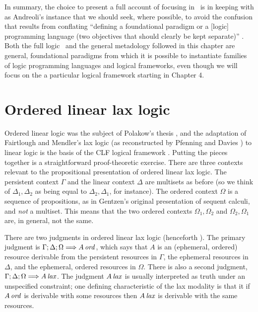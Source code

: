 In summary, the choice to present a full account of focusing in
\ollll~is in keeping with as Andreoli's instance that we should seek,
where possible, to avoid the confusion that results from conflating
``defining a foundational paradigm or a [logic] programming language
(two objectives that should clearly be kept separate)''
\cite{andreoli01focussing}. Both the full logic \ollll~and the general
metadology followed in this chapter are general, foundational
paradigms from which it is possible to instantiate families of logic
programming languages and logical frameworks, even though we will
focus on the a particular logical framework starting in Chapter 4.

\section{Ordered linear lax logic}
\label{sec:ord-unfocused}

Ordered linear logic was the subject of Polakow's thesis
\cite{polakow01ordered}, and the adaptation of Fairtlough and
Mendler's lax logic \cite{fairtlough95propositional} (as reconstructed
by Pfenning and Davies \cite{pfenning01judgmental}) to linear logic is
the basis of the CLF logical framework
\cite{watkins02concurrent}. Putting the pieces together 
is a straightforward proof-theoretic exercise. There are three contexts
relevant to the propositional presentation of ordered linear lax logic.
The persistent context $\Gamma$ and the linear context $\Delta$
are multisets as before (so we think of $\Delta_1, \Delta_2$ as being
equal to $\Delta_2, \Delta_1$, for instance). The ordered context
$\Omega$ is a sequence of propositions, as in Gentzen's original
presentation of sequent calculi, and {\it not} a multiset.
This means that the two ordered
contexts $\Omega_1, \Omega_2$ and $\Omega_2, \Omega_1$ are, in general,
not the same.



There are two judgments in ordered linear lax logic (henceforth \ollll). 
The primary
judgment is ${\Gamma};{\Delta};{\Omega} \Longrightarrow {{A}\,{{\it ord}}} \mathstrut$, which says
that $A$ is an (ephemeral, ordered) resource derivable from the
persistent resources in $\Gamma$, the ephemeral resources in $\Delta$,
and the ephemeral, ordered resources in $\Omega$. There is also a
second judgment, ${\Gamma};{\Delta};{\Omega} \Longrightarrow {{A}\,{{\it lax}}} \mathstrut$. The
judgment ${A}\,{{\it lax}}$ is usually interpreted as truth under an
unspecified constraint; one defining characteristic of the lax
modality is that it if ${A}\,{{\it ord}}$ is derivable with 
some resources then ${A}\,{{\it lax}}$ is derivable with the same resources.

